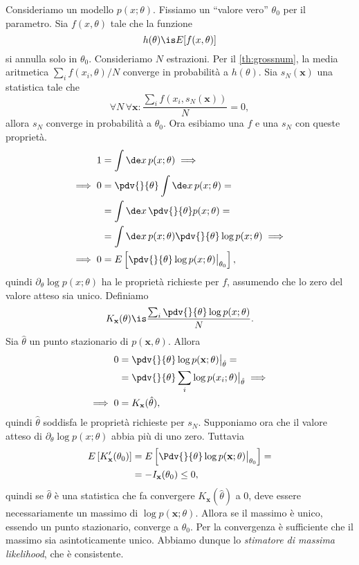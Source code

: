 Consideriamo un modello $p(x;\theta)$.
Fissiamo un ``valore vero'' $\theta_0$ per il parametro.
%
Sia $f(x,\theta)$ tale che la funzione
\begin{equation*}
	h(\theta)\is E[f(x,\theta)]
\end{equation*}
si annulla solo in $\theta_0$.
Consideriamo $N$ estrazioni.
Per il \autoref{th:grossnum},
la media aritmetica $\sum_i f(x_i,\theta)/N$ converge in probabilità a $h(\theta)$.
Sia $s_N(\mathbf x)$ una statistica tale che
\begin{equation*}
	\forall N \,\forall\mathbf x: \frac{\sum_i f(x_i,s_N(\mathbf x))}N = 0,
\end{equation*}
allora $s_N$ converge in probabilità a $\theta_0$.
%
Ora esibiamo una $f$ e una $s_N$ con queste proprietà.
\begin{align*}
	1
	&= \int\de x\, p(x;\theta) \implies \\
	\implies 0
	&= \pdv{}{\theta} \int\de x\, p(x;\theta) = \\
	&= \int\de x\, \pdv{}{\theta} p(x;\theta) = \\
	&= \int\de x\, p(x;\theta) \pdv{}{\theta} \log p(x;\theta) \implies \\
	\implies 0
	&= E \left[ \pdv{}{\theta} \log p(x;\theta) \big|_{\theta_0} \right],
\end{align*}
quindi $\partial_\theta \log p(x;\theta)$ ha le proprietà richieste per $f$,
assumendo che lo zero del valore atteso sia unico.
Definiamo
\begin{equation*}
	K_{\mathbf x}(\theta)
	\is \frac{\sum_i \pdv{}{\theta} \log p(x;\theta)} N.
\end{equation*}
Sia $\hat\theta$ un punto stazionario di $p(\mathbf x,\theta)$.
Allora
\begin{align*}
	0
	&= \pdv{}{\theta} \log p(\mathbf x;\theta) \big|_{\hat\theta} = \\
	&= \pdv{}{\theta} \sum_i \log p(x_i;\theta) \big|_{\hat\theta} \implies \\
	\implies 0
	&= K_{\mathbf x}(\hat\theta),
\end{align*}
quindi $\hat\theta$ soddisfa le proprietà richieste per $s_N$.
Supponiamo ora che il valore atteso di
$\partial_\theta \log p(x;\theta)$
abbia più di uno zero.
Tuttavia
\begin{align*}
	E \left[ K_{\mathbf x}'(\theta_0) \right]
	&= E \left[ \Pdv{}{\theta} \log p(\mathbf x;\theta) \big|_{\theta_0} \right] = \\
	&= -I_{\mathbf x}(\theta_0)
	\le 0,
\end{align*}
quindi se $\hat\theta$ è una statistica che fa convergere $K_{\mathbf x}(\hat\theta)$ a $0$,
deve essere necessariamente un massimo di $\log p(\mathbf x;\theta)$.
%
Allora se il massimo è unico, essendo un punto stazionario,
converge a $\theta_0$.
Per la convergenza è sufficiente che il massimo sia asintoticamente unico.
Abbiamo dunque lo \emph{stimatore di massima likelihood},
che è consistente.

